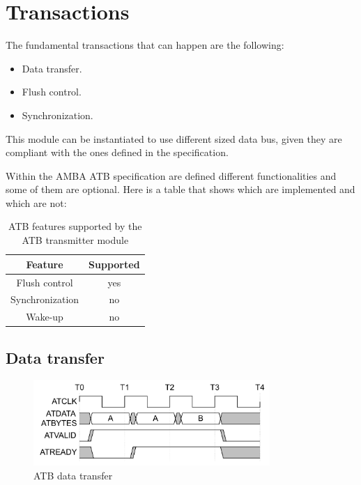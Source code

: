 \section{Transactions}

The fundamental transactions that can happen are the following:
\begin{itemize}
    \item   Data transfer.
    \item   Flush control.
    \item   Synchronization.
\end{itemize}

This module can be instantiated to use different sized data bus, given they are compliant with 
the ones defined in the specification.

Within the AMBA ATB specification are defined different functionalities and some of them are 
optional. Here is a table that shows which are implemented and which are not:
\begin{table}[H]
    \centering
    \begin{tabular}{|c|c|} 
        \hline
        Feature         & Supported \\ \hline
        Flush control   & yes       \\ \hline
        Synchronization & no        \\ \hline
        Wake-up         & no        \\ \hline
    \end{tabular}
    \caption{ATB features supported by the ATB transmitter module} 
    \label{tab:ATB_supported_features}
\end{table}

\subsection{Data transfer}
\begin{figure}[H]
    \centering
    \includegraphics[width=0.8\textwidth]{img/atb_data_transfer.png}
    \caption{ATB data transfer}
    \label{fig:atb_data_transfer}
\end{figure}

